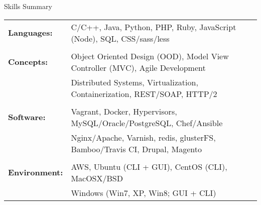 \documentclass{resume} %
\begin{document}

\begin{rSection}{Skills Summary}

\begin{tabular}{ @{} >{\bfseries}l @{\hspace{6ex}} l }
Languages: & C/C++, Java, Python, PHP, Ruby, JavaScript (Node), SQL, CSS/sass/less  \\\\ 
Concepts: & Object Oriented Design (OOD), Model View Controller (MVC), Agile Development  \\
 & Distributed Systems, Virtualization, Containerization, REST/SOAP, HTTP/2  \\\\
Software: & Vagrant, Docker, Hypervisors, MySQL/Oracle/PostgreSQL, Chef/Ansible\\
 & Nginx/Apache, Varnish, redis, glusterFS, Bamboo/Travis CI, Drupal, Magento  \\\\
Environment: & AWS, Ubuntu (CLI + GUI), CentOS (CLI), MacOSX/BSD \\
 & Windows (Win7, XP, Win8; GUI + CLI)
\end{tabular}

\end{rSection}


\end{document}
